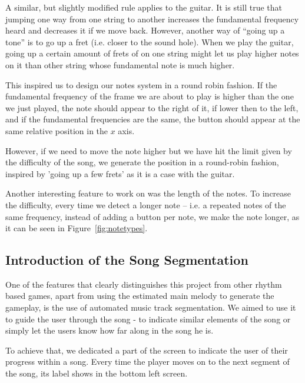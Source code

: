 A similar, but slightly modified rule applies to the guitar. It is still true that jumping one way from one string to another increases the fundamental frequency heard and decreases it if we move back. However, another way of ``going up a tone'' is to go up a fret (i.e. closer to the sound hole). When we play the guitar, going up a certain amount of frets of on one string might let us play higher notes on it than other string whose fundamental note is much higher. 

This inspired us to design our notes system in a round robin fashion. If the fundamental frequency of the frame we are about to play is higher than the one we just played, the note should appear to the right of it, if lower then to the left, and if the fundamental frequencies are the same, the button should appear at the same relative position in the $x$ axis. 

However, if we need to move the note higher but we have hit the limit given by the difficulty of the song, we generate the position in a round-robin fashion, inspired by 'going up a few frets' as it is a case with the guitar.

Another interesting feature to work on was the length of the notes. To increase the difficulty, every time we detect a longer note -- i.e. a repeated notes of the same frequency, instead of adding a button per note, we make the note longer, as it can be seen in Figure~\ref{fig:notetypes}.

\vspace{10pt}

\subsection{Introduction of the Song Segmentation}

One of the features that clearly distinguishes this project from other rhythm based games, apart from using the estimated main melody to generate the gameplay, is the use of automated music track segmentation. We aimed to use it to guide the user through the song - to indicate similar elements of the song or simply let the users know how far along in the song he is. 

To achieve that, we dedicated a part of the screen to indicate the user of their progress within a song. Every time the player moves on to the next segment of the song, its label shows in the bottom left screen.

\vspace{10pt}
\newpage

